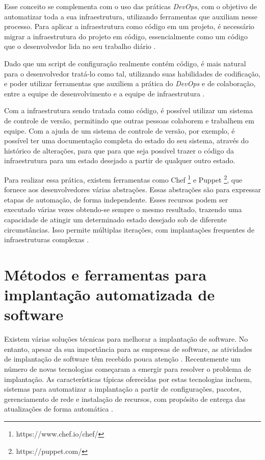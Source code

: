 Esse conceito se complementa com o uso das práticas \textit{DevOps}, com o objetivo
de automatizar toda a sua infraestrutura, utilizando ferramentas que auxiliam nesse
processo. Para aplicar a infraestrutura como código em um projeto, é necessário
migrar a infraestrutura do projeto em código, essencialmente como um
código que o desenvolvedor lida no seu trabalho diário \cite{byhand}.

Dado que um script de configuração realmente contém código, é mais natural
para o desenvolvedor tratá-lo como tal, utilizando suas habilidades de codificação,
e poder utilizar ferramentas que auxiliem a prática do \textit{DevOps} e de colaboração,
entre a equipe de desenvolvimento e a equipe de infraestrutura \cite{byhand}. 

Com a infraestrutura sendo tratada como código, é possível utilizar um
sistema de controle de versão, permitindo que outras pessoas colaborem e trabalhem em
equipe. Com a ajuda de um sistema de controle de versão, por exemplo, é possível 
ter uma documentação completa do estado do seu sistema, 
através do histórico de alterações, para que para que seja possível
trazer o código da infraestrutura para um estado desejado a partir de
qualquer outro estado.

Para realizar essa prática, existem ferramentas como Chef \footnote{https://www.chef.io/chef/} e 
Puppet \footnote{https://puppet.com/}, que
fornece aos desenvolvedores várias abstrações. Essas abstrações são para 
expressar etapas de automação,
de forma independente. Esses recursos podem ser executado várias vezes
obtendo-se sempre o mesmo resultado, trazendo uma capacidade de atingir um determinado
estado desejado sob de diferente circunstâncias. Isso permite múltiplas iterações, 
com implantações frequentes de infraestruturas complexas
\cite{Hummer2013}.

\section{Métodos e ferramentas para implantação automatizada de software}
\label{subsec:metodoseferramentas}

Existem várias soluções técnicas para melhorar a implantação de software. No 
entanto, apesar da sua importância para as empresas de software, as atividades
de implantação de software têm recebido pouca atenção \cite{5741269}. Recentemente 
um número de novas tecnologias começaram a emergir para
resolver o problema de implantação. As características típicas oferecidas por
estas tecnologias incluem, sistemas para automatizar a implantação a partir de
configurações, pacotes, gerenciamento de rede e instalação de recursos, com
propósito de entrega das atualizações de forma automática \cite{deployment1998}.

